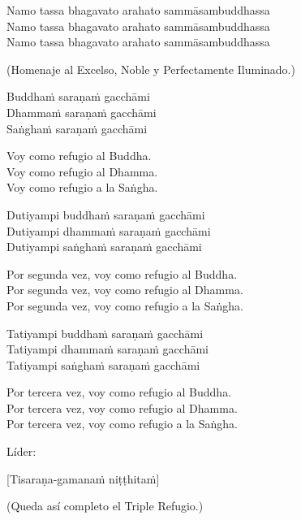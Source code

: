 Namo tassa bhagavato arahato sammāsambuddhassa\\
Namo tassa bhagavato arahato sammāsambuddhassa\\
Namo tassa bhagavato arahato sammāsambuddhassa

\begin{english}
 (Homenaje al Excelso, Noble y Perfectamente Iluminado.)\\
\end{english}

Buddhaṁ saraṇaṁ gacchāmi\\
Dhammaṁ saraṇaṁ gacchāmi\\
Saṅghaṁ saraṇaṁ gacchāmi

\begin{english}
  Voy como refugio al Buddha.\\
  Voy como refugio al Dhamma.\\
  Voy como refugio a la Saṅgha.
\end{english}

Dutiyampi buddhaṁ saraṇaṁ gacchāmi\\
Dutiyampi dhammaṁ saraṇaṁ gacchāmi\\
Dutiyampi saṅghaṁ saraṇaṁ gacchāmi

\begin{english}
  Por segunda vez, voy como refugio al Buddha.\\
  Por segunda vez, voy como refugio al Dhamma.\\
  Por segunda vez, voy como refugio a la Saṅgha.
\end{english}

Tatiyampi buddhaṁ saraṇaṁ gacchāmi\\
Tatiyampi dhammaṁ saraṇaṁ gacchāmi\\
Tatiyampi saṅghaṁ saraṇaṁ gacchāmi

\clearpage

\begin{english}
  Por tercera vez, voy como refugio al Buddha.\\
  Por tercera vez, voy como refugio al Dhamma.\\
  Por tercera vez, voy como refugio a la Saṅgha.
\end{english}

\begin{instruction}
  Líder:
\end{instruction}

[Tisaraṇa-gamanaṁ niṭṭhitaṁ]

\begin{english}
  (Queda así completo el Triple Refugio.)
\end{english}

